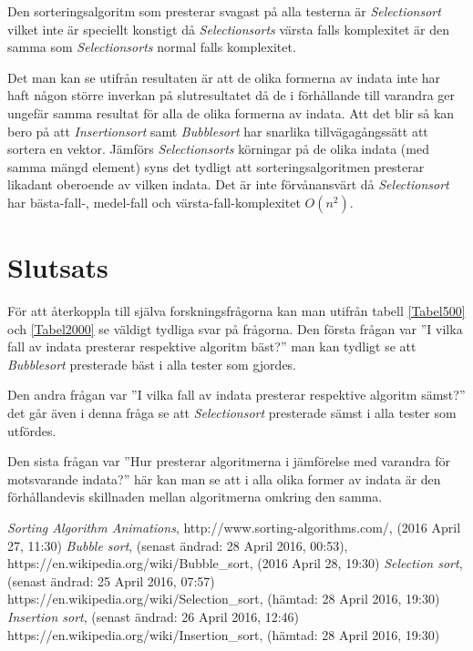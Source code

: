 \documentclass[a4paper]{article}
\begin{document}
Den sorteringsalgoritm som presterar svagast på alla testerna är \emph{Selectionsort} vilket inte är speciellt konstigt då \emph{Selectionsorts} värsta falls komplexitet är den samma som \emph{Selectionsorts} normal falls komplexitet. 

Det man kan se utifrån resultaten är att de olika formerna av indata inte har haft någon större inverkan på slutresultatet då de i förhållande till varandra ger ungefär samma resultat för alla de olika formerna av indata. Att det blir så kan bero på att \emph{Insertionsort} samt \emph{Bubblesort} har snarlika tillvägagångssätt att sortera en vektor. Jämförs \emph{Selectionsorts} körningar på de olika indata (med samma mängd element) syns det tydligt att sorteringsalgoritmen presterar likadant oberoende av vilken indata. Det är inte förvånansvärt då \emph{Selectionsort} har bästa-fall-, medel-fall och värsta-fall-komplexitet $O(n^2)$.   

\section{Slutsats}
För att återkoppla till själva forskningsfrågorna kan man utifrån tabell \ref{Tabel500} och \ref{Tabel2000} se väldigt tydliga svar på frågorna. Den första frågan var ''I vilka fall av indata presterar respektive algoritm bäst?'' man kan tydligt se att \emph{Bubblesort} presterade bäst i alla tester som gjordes.

Den andra frågan var ''I vilka fall av indata presterar respektive algoritm sämst?'' det går även i denna fråga se att \emph{Selectionsort} presterade sämst i alla tester som utfördes.

Den sista frågan var ''Hur presterar algoritmerna i jämförelse med varandra för motsvarande indata?'' här kan man se att i alla olika former av indata är den förhållandevis skillnaden mellan algoritmerna omkring den samma.

\begin{thebibliography}{99}
	 \emph{Sorting Algorithm Animations}, http://www.sorting-algorithms.com/, (2016 April 27, 11:30)
	 \emph{Bubble sort}, (senast ändrad: 28 April 2016, 00:53), https://en.wikipedia.org/wiki/Bubble\_sort, (2016 April 28, 19:30)
	 \emph{Selection sort}, (senast ändrad: 25 April 2016, 07:57) https://en.wikipedia.org/wiki/Selection\_sort, (hämtad: 28 April 2016, 19:30)
	 \emph{Insertion sort}, (senast ändrad: 26 April 2016, 12:46) https://en.wikipedia.org/wiki/Insertion\_sort, (hämtad: 28 April 2016, 19:30)
\end{thebibliography}
\end{document}
